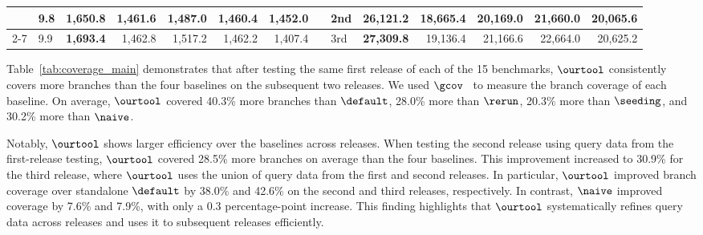 \begin{table}[]
{\begin{tabular}{l|l|rrrrr||l|l|rrrrr}
                            & 9.8     & \multicolumn{1}{r|}{\textbf{1,650.8}} & \multicolumn{1}{r|}{1,461.6} & \multicolumn{1}{r|}{1,487.0} & \multicolumn{1}{r|}{1,460.4} & 1,452.0                    &                          & 2nd     & \multicolumn{1}{r|}{\textbf{26,121.2}} & \multicolumn{1}{r|}{18,665.4} & \multicolumn{1}{r|}{20,169.0} & \multicolumn{1}{r|}{21,660.0} & 20,065.6                  \\ \cmidrule(lr){2-7} \cmidrule{9-14} 
                            & 9.9     & \multicolumn{1}{r|}{\textbf{1,693.4}} & \multicolumn{1}{r|}{1,462.8} & \multicolumn{1}{r|}{1,517.2} & \multicolumn{1}{r|}{1,462.2} & 1,407.4                    &                          & 3rd     & \multicolumn{1}{r|}{\textbf{27,309.8}} & \multicolumn{1}{r|}{19,136.4} & \multicolumn{1}{r|}{21,166.6} & \multicolumn{1}{r|}{22,664.0} & 20,625.2                  \\ \midrule \bottomrule
    \end{tabular}%
    }
\end{table}
\fi

Table~\ref{tab:coverage_main} demonstrates that after testing the same first release of each of the 15 benchmarks, $\ourtool$ consistently covers more branches than the four baselines on the subsequent two releases. We used $\gcov$~\cite{gcov} to measure the branch coverage of each baseline. On average, $\ourtool$ covered 40.3\% more branches than $\default$, 28.0\% more than $\rerun$, 20.3\% more than $\seeding$, and 30.2\% more than $\naive$.

Notably, $\ourtool$ shows larger efficiency over the baselines across releases. When testing the second release using query data from the first-release testing, $\ourtool$ covered 28.5\% more branches on average than the four baselines. This improvement increased to 30.9\% for the third release, where $\ourtool$ uses the union of query data from the first and second releases. In particular, $\ourtool$ improved branch coverage over standalone $\default$ by 38.0\% and 42.6\% on the second and third releases, respectively. In contrast, $\naive$ improved coverage by 7.6\% and 7.9\%, with only a 0.3 percentage-point increase. This finding highlights that $\ourtool$ systematically refines query data across releases and uses it to subsequent releases efficiently.

